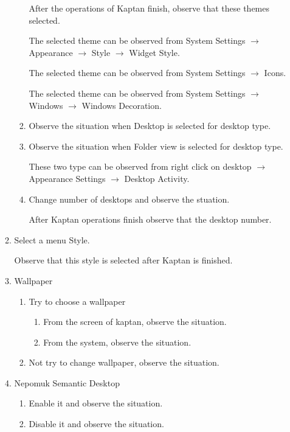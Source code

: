 \documentclass[a4paper,10pt]{article}
\begin{document}
\begin{enumerate}
\begin{enumerate}
\begin{enumerate}
        After the operations of Kaptan finish, observe that these themes selected.

        The selected theme can be observed from System Settings $\rightarrow$ Appearance $\rightarrow$ Style $\rightarrow$ Widget Style.

        
        The selected theme can be observed from System Settings $\rightarrow$ Icons.


        The selected theme can be observed from System Settings $\rightarrow$ Windows $\rightarrow$ Windows Decoration.
        
        \item Observe the situation when Desktop is selected for desktop type.

        \item Observe the situation when  Folder view is selected for desktop type.

        These two type can be observed from right click on desktop $\rightarrow$ Appearance Settings 
        $\rightarrow$ Desktop Activity.

        \item Change number of desktops and observe the stuation.

        After Kaptan operations finish observe that the desktop number. 
        \end{enumerate}

    \item Select a menu Style.

    Observe that this style is selected after Kaptan is finished.

    \item Wallpaper
        \begin{enumerate}
        \item Try to choose a wallpaper
            \begin{enumerate}
            \item From the screen of kaptan, observe the situation.
            \item From the system, observe the situation.
            \end{enumerate}
        \item Not try to change wallpaper, observe the situation.
        \end{enumerate}

    \item Nepomuk Semantic Desktop
        \begin{enumerate}
        \item Enable it and  observe the situation.
        \item Disable it and  observe the situation.


\end{enumerate}
\end{enumerate}
\end{enumerate}
\end{document}
